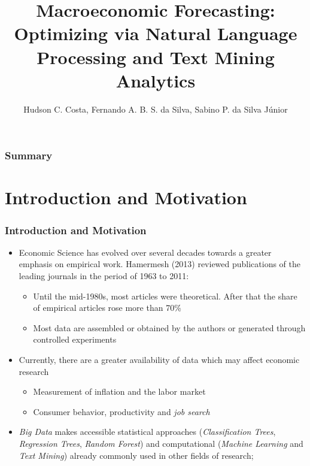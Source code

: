 \documentclass[aspectratio=169]{beamer}
\title[\sc{}]{Macroeconomic Forecasting: Optimizing via Natural Language Processing and Text Mining Analytics}
\author{Hudson C. Costa, Fernando A. B. S. da Silva, Sabino P. da Silva Júnior}
\institute{Data Pier and IBMEC/MG, Department of Statistics/UFRGS, PPGE/UFRGS}
\date{}
\begin{document}
%


\begin{frame}
  \titlepage
\end{frame}

\begin{frame}[plain]\frametitle{Summary}
\small\tableofcontents
\end{frame}

\section{Introduction and Motivation}

\begin{frame}\frametitle{Introduction and Motivation}
  \begin{itemize}
  \item Economic Science has evolved over several decades towards a greater emphasis on empirical work. Hamermesh (2013) reviewed publications of the leading journals in the period of 1963 to 2011:
  
  
    \begin{itemize}
      \item Until the mid-1980s, most articles were theoretical. After that the share of empirical articles rose more than 70\% 
      \item Most data are assembled or obtained by the authors or generated through controlled experiments 
    \end{itemize}
  \item Currently, there are a greater availability of data which may affect economic research
    \begin{itemize}
      \item Measurement of inflation and the labor market
       \item  Consumer behavior, productivity and \emph{job search}
    \end{itemize}
  \item \emph{Big Data} makes accessible statistical approaches (\emph{Classification Trees}, \emph{Regression Trees}, \emph{Random Forest}) and computational (\emph{Machine Learning} and \emph{Text Mining}) already commonly used in other fields of research;
  \end{itemize}
\end{frame}
\end{document}
